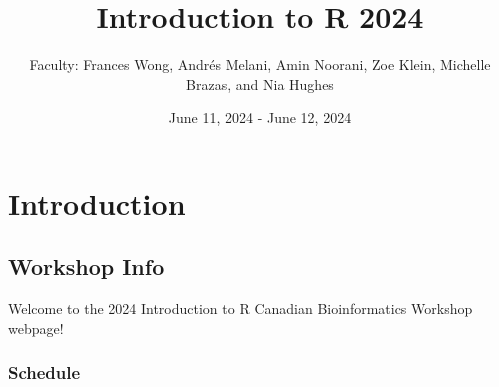 \documentclass[
]{book}
\title{Introduction to R 2024}
\author{Faculty: Frances Wong, Andrés Melani, Amin Noorani, Zoe Klein, Michelle Brazas, and Nia Hughes}
\date{June 11, 2024 - June 12, 2024}
\begin{document}
\maketitle

{
\setcounter{tocdepth}{1}
\tableofcontents
}
\part{Introduction}\label{part-introduction}

\chapter{Workshop Info}\label{workshop-info}

Welcome to the 2024 Introduction to R Canadian Bioinformatics Workshop webpage!

\section{Schedule}\label{schedule}
\end{document}
